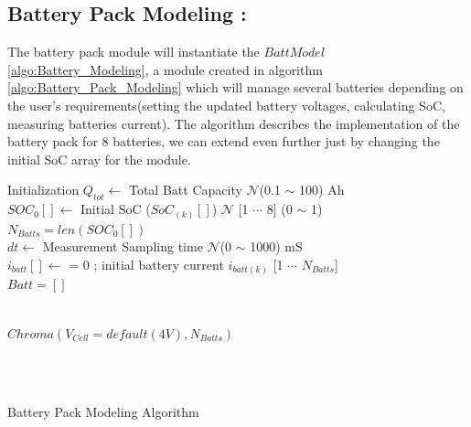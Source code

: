 \subsection{Battery Pack Modeling :}
The battery pack module will instantiate the $BattModel$ \ref{algo:Battery_Modeling}, a module created in algorithm \ref{algo:Battery_Pack_Modeling}  which will manage several batteries depending on the user's requirements(setting the updated battery voltages, calculating SoC, measuring batteries current). The algorithm describes the implementation of the battery pack for 8 batteries, we can extend even further just by changing the initial SoC array for the module.
\begin{algorithm}[H]\label{algo:Battery_Pack_Modeling}   
\DontPrintSemicolon
    \SetAlgoLined

    Initialization\;
    $Q_{tot} \leftarrow$ Total Batt Capacity  $\mathcal{N} $(0.1 $\sim $ 100) Ah\\
    $SOC_0[] \leftarrow$ Initial SoC ($SoC_{(k)}[]$) $\mathcal{N}$ [1 $\cdots$  8] (0 $\sim $ 1) \\
    $N_{Batts} = len(SOC_0[])$ \\
    $dt \leftarrow$  Measurement Sampling time $\mathcal{N}$(0 $\sim $ 1000) mS \\   
    $i_{batt}[] \leftarrow$ = 0 ; initial battery current $i_{batt(k)}$ [1  $\cdots$ $N_{Batts}$]\\  
    $Batt = []$ 

    \\
    $Chroma(V_{Cell}=default (4V),N_{Batts} )$

    \\

    \\
    \caption{Battery Pack Modeling Algorithm}
\end{algorithm}

